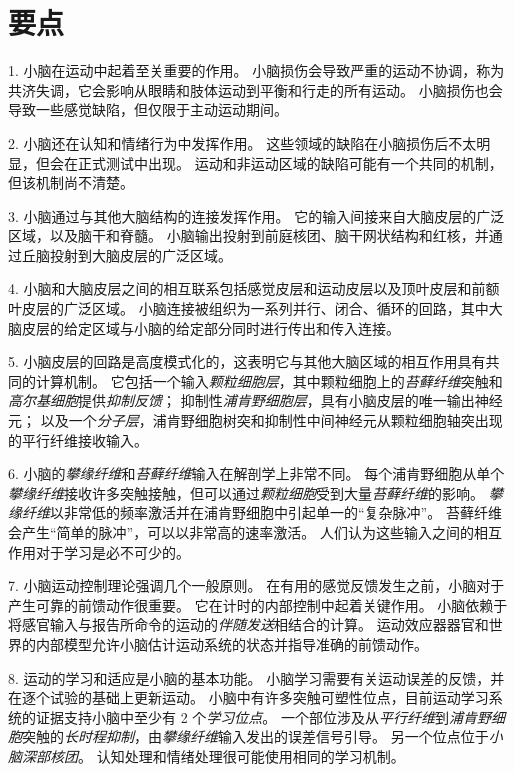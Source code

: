 \section{要点}

1. 小脑在运动中起着至关重要的作用。
小脑损伤会导致严重的运动不协调，称为共济失调，它会影响从眼睛和肢体运动到平衡和行走的所有运动。
小脑损伤也会导致一些感觉缺陷，但仅限于主动运动期间。


2. 小脑还在认知和情绪行为中发挥作用。
这些领域的缺陷在小脑损伤后不太明显，但会在正式测试中出现。
运动和非运动区域的缺陷可能有一个共同的机制，但该机制尚不清楚。


3. 小脑通过与其他大脑结构的连接发挥作用。
它的输入间接来自大脑皮层的广泛区域，以及脑干和脊髓。
小脑输出投射到前庭核团、脑干网状结构和红核，并通过丘脑投射到大脑皮层的广泛区域。


4. 小脑和大脑皮层之间的相互联系包括感觉皮层和运动皮层以及顶叶皮层和前额叶皮层的广泛区域。
小脑连接被组织为一系列并行、闭合、循环的回路，其中大脑皮层的给定区域与小脑的给定部分同时进行传出和传入连接。


5. 小脑皮层的回路是高度模式化的，这表明它与其他大脑区域的相互作用具有共同的计算机制。
它包括一个输入\textit{颗粒细胞层}，其中颗粒细胞上的\textit{苔藓纤维}突触和\textit{高尔基细胞}提供\textit{抑制反馈}；
抑制性\textit{浦肯野细胞层}，具有小脑皮层的唯一输出神经元；
以及一个\textit{分子层}，浦肯野细胞树突和抑制性中间神经元从颗粒细胞轴突出现的平行纤维接收输入。


6. 小脑的\textit{攀缘纤维}和\textit{苔藓纤维}输入在解剖学上非常不同。
每个浦肯野细胞从单个\textit{攀缘纤维}接收许多突触接触，但可以通过\textit{颗粒细胞}受到大量\textit{苔藓纤维}的影响。
\textit{攀缘纤维}以非常低的频率激活并在浦肯野细胞中引起单一的“复杂脉冲”。
苔藓纤维会产生“简单的脉冲”，可以以非常高的速率激活。
人们认为这些输入之间的相互作用对于学习是必不可少的。


7. 小脑运动控制理论强调几个一般原则。
在有用的感觉反馈发生之前，小脑对于产生可靠的前馈动作很重要。
它在计时的内部控制中起着关键作用。
小脑依赖于将感官输入与报告所命令的运动的\textit{伴随发送}相结合的计算。
运动效应器器官和世界的内部模型允许小脑估计运动系统的状态并指导准确的前馈动作。


8. 运动的学习和适应是小脑的基本功能。
小脑学习需要有关运动误差的反馈，并在逐个试验的基础上更新运动。
小脑中有许多突触可塑性位点，目前运动学习系统的证据支持小脑中至少有 2 个\textit{学习位点}。
一个部位涉及从\textit{平行纤维}到\textit{浦肯野细胞}突触的\textit{长时程抑制}，由\textit{攀缘纤维}输入发出的误差信号引导。
另一个位点位于\textit{小脑深部核团}。
认知处理和情绪处理很可能使用相同的学习机制。
